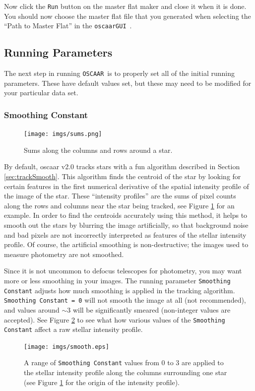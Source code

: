 \documentclass[a4paper]{article}
\newcommand{\code}[1]{\texttt{#1}}
\newcommand{\oscaar}{\code{OSCAAR}~}
\newcommand{\gui}{\code{oscaarGUI}~}
\begin{document}
Now click the \code{Run} button on the master flat maker and close it when it is done. You should now choose the master flat file that you generated when selecting the ``Path to Master Flat'' in the \gui. 

\subsection{Running Parameters}
The next step in running \oscaar is to properly set all of the initial running parameters. These have default values set, but these may need to be modified for your particular data set.

\subsubsection{Smoothing Constant} \label{sec:smoothingconst}
\begin{figure}[H]
\begin{center}
\texttt{[image: imgs/sums.png]}
\caption{Sums along the columns and rows around a star.}
\label{fig:sumsExample}
\end{center}	
\end{figure}
By default, oscaar v2.0 tracks stars with a fun algorithm described in Section \ref{sec:trackSmooth}. This algorithm finds the centroid of the star by looking for certain features in the first numerical derivative of the spatial intensity profile of the image of the star. These ``intensity profiles'' are the sums of pixel counts along the rows and columns near the star being tracked, see Figure \ref{fig:sumsExample} for an example. In order to find the centroids accurately using this method, it helps to smooth out the stars by blurring the image artificially, so that background noise and bad pixels are not incorrectly  interpreted as features of the stellar intensity profile. Of course, the artificial smoothing is non-destructive; the images used to measure photometry are not smoothed. 

Since it is not uncommon to defocus telescopes for photometry, you may want more or less smoothing in your images. The running parameter \code{Smoothing Constant} adjusts how much smoothing is applied in the tracking algorithm. \code{Smoothing Constant = 0} will not smooth the image at all (not recommended), and values around $\sim3$ will be significantly smeared (non-integer values are accepted). See Figure \ref{fig:smoothExample} to see what how various values of the \code{Smoothing Constant} affect a raw stellar intensity profile.
\begin{figure}[H]
\begin{center}
\texttt{[image: imgs/smooth.eps]}
\caption{A range of \code{Smoothing Constant} values from 0 to 3 are applied to the stellar intensity profile along the columns surrounding one star (see Figure \ref{fig:sumsExample} for the origin of the intensity profile).}
\label{fig:smoothExample}
\end{center}	
\end{figure}
\end{document}
